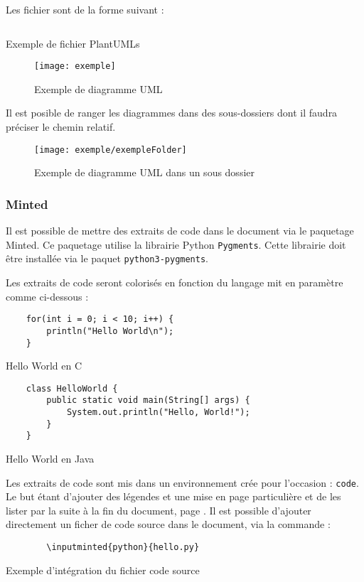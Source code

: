 Les fichier sont de la forme suivant :
\begin{code}
    \inputminted{vim}{../schemas/exemple.plantuml}
    \caption{Exemple de fichier PlantUMLs}
\end{code}

\begin{figure}[H]
    \centering
    \texttt{[image: exemple]}
    \caption{Exemple de diagramme UML}
\end{figure}

Il est posible de ranger les diagrammes dans des sous-dossiers dont il faudra préciser le chemin relatif.
\begin{figure}[H]
    \centering
    \texttt{[image: exemple/exempleFolder]}
    \caption{Exemple de diagramme UML dans un sous dossier }
\end{figure}

\subsubsection{Minted}
Il est possible de mettre des extraits de code dans le document via le paquetage Minted.
Ce paquetage utilise la librairie Python \verb=Pygments=.
Cette librairie doit être installée via le paquet \verb=python3-pygments=.

Les extraits de code seront colorisés en fonction du langage mit en paramètre comme ci-dessous :

\begin{code}
    \begin{verbatim}
    for(int i = 0; i < 10; i++) {
        println("Hello World\n");
    }
\end{verbatim}
    \caption{Hello World en C}
\end{code}

\begin{code}
    \begin{verbatim}
    class HelloWorld {
        public static void main(String[] args) {
            System.out.println("Hello, World!");
        }
    }
\end{verbatim}
    \caption{Hello World en Java}
\end{code}

Les extraits de code sont mis dans un environnement crée pour l'occasion : \verb=code=.
Le but étant d'ajouter des légendes et une mise en page particulière et de les lister par la suite à la fin du document,
page \pageref{TableOfCode}.
Il est possible d'ajouter directement un ficher de code source dans le document, via la commande :
\begin{code}
    \begin{verbatim}
        \inputminted{python}{hello.py}
\end{verbatim}
    \caption{Exemple d'intégration du fichier code source}
\end{code}

